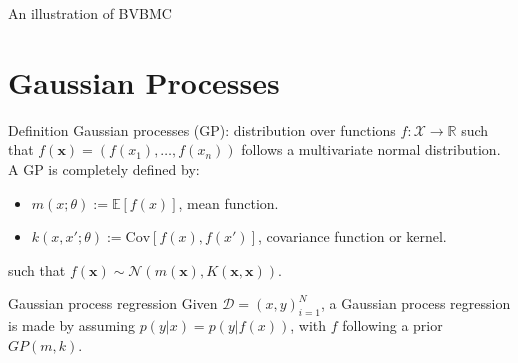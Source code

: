 \documentclass{beamer}
\def \Ev {{\mathbb E}}
\newcommand{\Cov}{\mathrm{Cov}}
\begin{document}
\begin{frame}{}
\begin{block}{An illustration of BVBMC}
{
}
\end{block}
\end{frame}

\section{Gaussian Processes}
\begin{frame}{}
\begin{block}{Definition}
Gaussian processes (GP): distribution over functions $f:\mathcal{X} \to \mathbb{R}$ such that $f(\mathbf{x}) = (f(x_1),\ldots,f(x_n))$ follows a multivariate normal distribution. A GP is completely defined by:
\begin{itemize}
\item $m(x;\theta) := \Ev[f(x)]$, mean function.
\item $k(x,x';\theta) := \Cov[f(x),f(x')]$, covariance function or kernel.
\end{itemize}
such that $f(\mathbf{x}) \sim \mathcal{N}(m(\mathbf{x}),K(\mathbf{x},\mathbf{x}))$.
\end{block}
\begin{block}{Gaussian process regression}
Given $\mathcal{D} = {(x,y)}_{i=1}^N$, a Gaussian process regression is made by assuming $p(y|x) = p(y|f(x))$, with $f$ following a prior $GP(m,k)$.
\end{block}

\end{frame}
\end{document}
